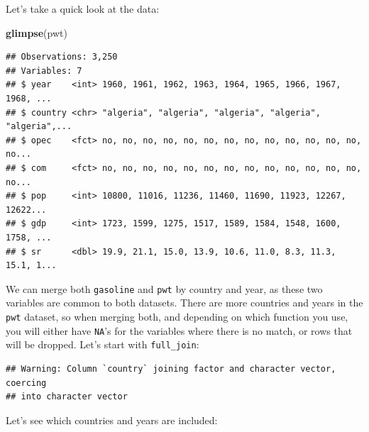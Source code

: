 \documentclass[]{gitbook}
\newenvironment{Shaded}{\begin{snugshade}}{\end{snugshade}}
\newcommand{\DataTypeTok}[1]{\textcolor[rgb]{0.13,0.29,0.53}{#1}}
\newcommand{\KeywordTok}[1]{\textcolor[rgb]{0.13,0.29,0.53}{\textbf{#1}}}
\newcommand{\NormalTok}[1]{#1}
\newcommand{\OperatorTok}[1]{\textcolor[rgb]{0.81,0.36,0.00}{\textbf{#1}}}
\newcommand{\StringTok}[1]{\textcolor[rgb]{0.31,0.60,0.02}{#1}}
\theoremstyle{definition}
\theoremstyle{definition}
\theoremstyle{definition}
\theoremstyle{remark}
\begin{document}
Let's take a quick look at the data:

\begin{Shaded}
\begin{Highlighting}[]
\KeywordTok{glimpse}\NormalTok{(pwt)}
\end{Highlighting}
\end{Shaded}

\begin{verbatim}
## Observations: 3,250
## Variables: 7
## $ year    <int> 1960, 1961, 1962, 1963, 1964, 1965, 1966, 1967, 1968, ...
## $ country <chr> "algeria", "algeria", "algeria", "algeria", "algeria",...
## $ opec    <fct> no, no, no, no, no, no, no, no, no, no, no, no, no, no...
## $ com     <fct> no, no, no, no, no, no, no, no, no, no, no, no, no, no...
## $ pop     <int> 10800, 11016, 11236, 11460, 11690, 11923, 12267, 12622...
## $ gdp     <int> 1723, 1599, 1275, 1517, 1589, 1584, 1548, 1600, 1758, ...
## $ sr      <dbl> 19.9, 21.1, 15.0, 13.9, 10.6, 11.0, 8.3, 11.3, 15.1, 1...
\end{verbatim}

We can merge both \texttt{gasoline} and \texttt{pwt} by country and
year, as these two variables are common to both datasets. There are more
countries and years in the \texttt{pwt} dataset, so when merging both,
and depending on which function you use, you will either have
\texttt{NA}'s for the variables where there is no match, or rows that
will be dropped. Let's start with \texttt{full\_join}:

\begin{Shaded}
\end{Shaded}

\begin{verbatim}
## Warning: Column `country` joining factor and character vector, coercing
## into character vector
\end{verbatim}

Let's see which countries and years are included:

\begin{Shaded}
\end{Shaded}
\end{document}
